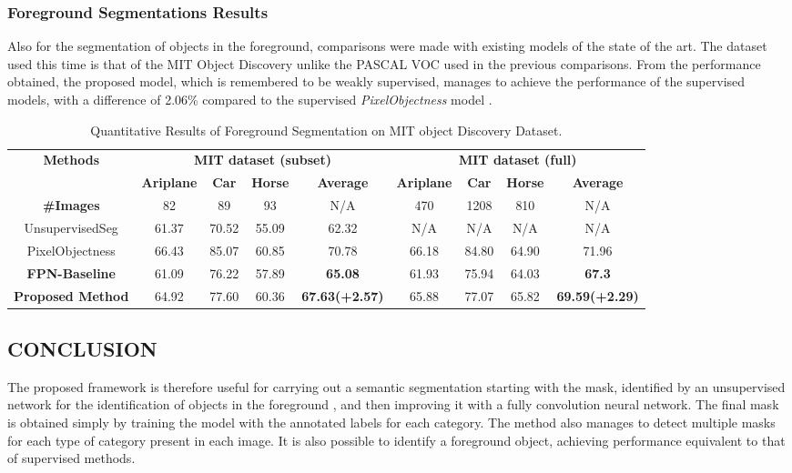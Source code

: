 \subsubsection{Foreground Segmentations Results}
Also for the segmentation of objects in the foreground, comparisons were 
made with existing models of the state of the art. The dataset used this 
time is that of the MIT Object Discovery unlike the PASCAL VOC used 
in the previous comparisons. From the performance obtained, the proposed 
model, which is remembered to be weakly supervised, manages to achieve the 
performance of the supervised models, with a difference of 2.06\% compared 
to the supervised \emph{PixelObjectness} model \cite{0876055538}.
\begin{table}[h!]
    \centering
    \begin{adjustbox}{max width=\textwidth}
    \begin{tabular}{|c||c|c|c|c||c|c|c|c|}
        \hline
        \multirow{2}{*}{\bfseries{Methods}} & \multicolumn{4}{c||}{\bfseries{MIT dataset (subset)}} & \multicolumn{4}{c|}{\bfseries{MIT dataset (full)}} \\            & \bfseries{Ariplane} & \bfseries{Car} & \bfseries{Horse}  & \bfseries{Average} & \bfseries{Ariplane} & \bfseries{Car} & \bfseries{Horse}  & \bfseries{Average} \\
        \hline
        \bfseries{\#Images} & 82 & 89 & 93 & N/A & 470 & 1208 & 810 & N/A\\
        \hline
        UnsupervisedSeg \cite{0876055520} & 61.37 & 70.52 & 55.09 &62.32 & N/A & N/A & N/A & N/A\\
        \hline
        PixelObjectness \cite{0876055538} & 66.43 & 85.07 & 60.85 &70.78 & 66.18 & 84.80 & 64.90 & 71.96\\
        \hline 
        \bfseries{FPN-Baseline} & 61.09 & 76.22 & 57.89 & \bfseries{65.08} & 61.93 & 75.94 & 64.03 & \bfseries{67.3}\\
        \hline
        \bfseries{Proposed Method} & 64.92 & 77.60 & 60.36 & \bfseries{67.63(+2.57)} & 65.88 & 77.07 & 65.82 & \bfseries{69.59(+2.29)}\\
        \hline
    \end{tabular}
    \end{adjustbox}
    \caption{Quantitative Results of Foreground Segmentation on MIT object Discovery Dataset.}
    \label{}
\end{table}

\subsection{CONCLUSION}
The proposed framework is therefore useful for carrying out a semantic segmentation 
starting with the mask, identified by an unsupervised network for 
the identification of objects in the foreground \cite{0876055520}, and then improving it 
with a fully convolution neural network. The final mask is obtained simply 
by training the model with the annotated labels for each category. The 
method also manages to detect multiple masks for each type of category 
present in each image. It is also possible to identify a foreground object, 
achieving performance equivalent to that of supervised methods.